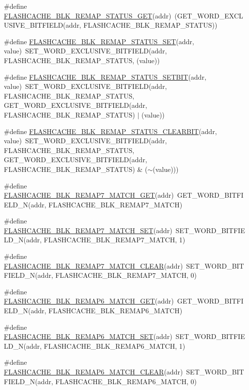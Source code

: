 \begin{DoxyCompactItemize}
\item 
\#define \hyperlink{a00549_aa390789ccba8d3780e4e695d956d964c}{FLASHCACHE\_\-BLK\_\-REMAP\_\-STATUS\_\-GET}(addr)~(GET\_\-WORD\_\-EXCLUSIVE\_\-BITFIELD(addr, FLASHCACHE\_\-BLK\_\-REMAP\_\-STATUS))
\item 
\#define \hyperlink{a00549_aa4cfee27c70aae6e6dc28f0e4eb794d3}{FLASHCACHE\_\-BLK\_\-REMAP\_\-STATUS\_\-SET}(addr, value)~SET\_\-WORD\_\-EXCLUSIVE\_\-BITFIELD(addr, FLASHCACHE\_\-BLK\_\-REMAP\_\-STATUS, (value))
\item 
\#define \hyperlink{a00549_af9e2f1c310ae28d624c4877e7deaa4c2}{FLASHCACHE\_\-BLK\_\-REMAP\_\-STATUS\_\-SETBIT}(addr, value)~SET\_\-WORD\_\-EXCLUSIVE\_\-BITFIELD(addr, FLASHCACHE\_\-BLK\_\-REMAP\_\-STATUS, GET\_\-WORD\_\-EXCLUSIVE\_\-BITFIELD(addr, FLASHCACHE\_\-BLK\_\-REMAP\_\-STATUS) $|$ (value))
\item 
\#define \hyperlink{a00549_a42c3ae6066ce034a1da416f17f1016b0}{FLASHCACHE\_\-BLK\_\-REMAP\_\-STATUS\_\-CLEARBIT}(addr, value)~SET\_\-WORD\_\-EXCLUSIVE\_\-BITFIELD(addr, FLASHCACHE\_\-BLK\_\-REMAP\_\-STATUS, GET\_\-WORD\_\-EXCLUSIVE\_\-BITFIELD(addr, FLASHCACHE\_\-BLK\_\-REMAP\_\-STATUS) \& ($\sim$(value)))
\item 
\#define \hyperlink{a00549_af20380ecadf368a242d4b29a7ae73dac}{FLASHCACHE\_\-BLK\_\-REMAP7\_\-MATCH\_\-GET}(addr)~GET\_\-WORD\_\-BITFIELD\_\-N(addr, FLASHCACHE\_\-BLK\_\-REMAP7\_\-MATCH)
\item 
\#define \hyperlink{a00549_a150da89a98ecd2c45970e9801d7306cb}{FLASHCACHE\_\-BLK\_\-REMAP7\_\-MATCH\_\-SET}(addr)~SET\_\-WORD\_\-BITFIELD\_\-N(addr, FLASHCACHE\_\-BLK\_\-REMAP7\_\-MATCH, 1)
\item 
\#define \hyperlink{a00549_a3ab2c07dcc5f38668939e1bbf6784042}{FLASHCACHE\_\-BLK\_\-REMAP7\_\-MATCH\_\-CLEAR}(addr)~SET\_\-WORD\_\-BITFIELD\_\-N(addr, FLASHCACHE\_\-BLK\_\-REMAP7\_\-MATCH, 0)
\item 
\#define \hyperlink{a00549_a014fa6239441dcd6bfecf7f451a62f96}{FLASHCACHE\_\-BLK\_\-REMAP6\_\-MATCH\_\-GET}(addr)~GET\_\-WORD\_\-BITFIELD\_\-N(addr, FLASHCACHE\_\-BLK\_\-REMAP6\_\-MATCH)
\item 
\#define \hyperlink{a00549_ac10f9d98862e1f9dcea4bed68983c112}{FLASHCACHE\_\-BLK\_\-REMAP6\_\-MATCH\_\-SET}(addr)~SET\_\-WORD\_\-BITFIELD\_\-N(addr, FLASHCACHE\_\-BLK\_\-REMAP6\_\-MATCH, 1)
\item 
\#define \hyperlink{a00549_a6c0ff7a5c4d4f298ed28488b3ceddefc}{FLASHCACHE\_\-BLK\_\-REMAP6\_\-MATCH\_\-CLEAR}(addr)~SET\_\-WORD\_\-BITFIELD\_\-N(addr, FLASHCACHE\_\-BLK\_\-REMAP6\_\-MATCH, 0)

\end{DoxyCompactItemize}

